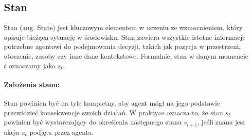 \subsection{Stan}

Stan (ang. State) jest kluczowym elementem w uczeniu ze wzmocnieniem, który opisuje bieżącą sytuację w środowisku. Stan zawiera wszystkie istotne informacje potrzebne agentowi do podejmowania decyzji, takich jak pozycja w przestrzeni, otoczenie, zasoby czy inne dane kontekstowe. Formalnie, stan w danym momencie \( t \) oznaczamy jako \( s_t \).

\paragraph{Założenia stanu:}
Stan powinien być na tyle kompletny, aby agent mógł na jego podstawie przewidzieć konsekwencje swoich działań. W praktyce oznacza to, że stan \( s_t \) powinien być wystarczający do określenia następnego stanu \( s_{t+1} \), jeśli znana jest akcja \( a_t \) podjęta przez agenta.

